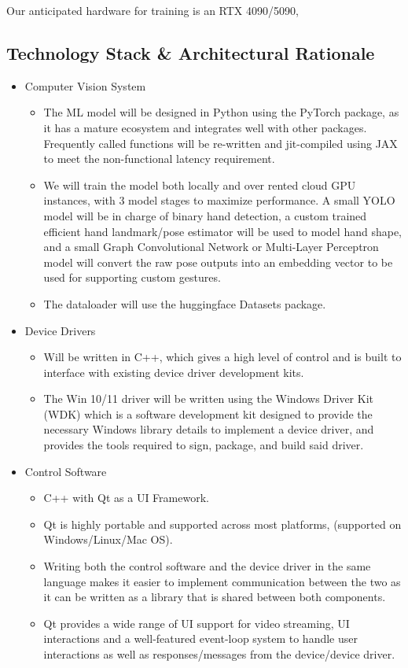 \documentclass{article}
\begin{document}
Our anticipated hardware for training is an RTX 4090/5090,

\subsection{Technology Stack \& Architectural Rationale}

\begin{itemize}
\item Computer Vision System
    \begin{itemize}
    \item The ML model will be designed in Python using the PyTorch package, as it has a mature ecosystem and integrates well with other packages. Frequently called functions will be re-written and jit-compiled using JAX to meet the non-functional latency requirement.
    \item We will train the model both locally and over rented cloud GPU instances, with 3 model stages to maximize performance. A small YOLO model will be in charge of binary hand detection, a custom trained efficient hand landmark/pose estimator will be used to model hand shape, and a small Graph Convolutional Network or Multi-Layer Perceptron model will convert the raw pose outputs into an embedding vector to be used for supporting custom gestures.
      
  \item The dataloader will use the  huggingface Datasets package.
    \end{itemize}
\item Device Drivers
    \begin{itemize}
    \item Will be written in C++, which gives a high level of control and is built to interface with existing device driver development kits.
    \item The Win 10/11 driver will be written using the Windows Driver Kit (WDK) which is a software development kit designed to provide the necessary Windows library details to implement a device driver, and provides the tools required to sign, package, and build said driver.
    \end{itemize}
\item Control Software
    \begin{itemize}
    \item C++ with Qt as a UI Framework.
    \item Qt is highly portable and supported across most platforms, (supported on Windows/Linux/Mac OS).
    \item Writing both the control software and the device driver in the same language makes it easier to implement communication between the two as it can be written as a library that is shared between both components.
    \item Qt provides a wide range of UI support for video streaming, UI interactions and a well-featured event-loop system to handle user interactions as well as responses/messages from the device/device driver.
    \end{itemize}
\end{itemize}
\end{document}

